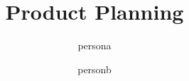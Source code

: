 \documentclass{article}
\begin{document}
\title{Product Planning}

\author{persona \and personb }
\maketitle





\end{document}
